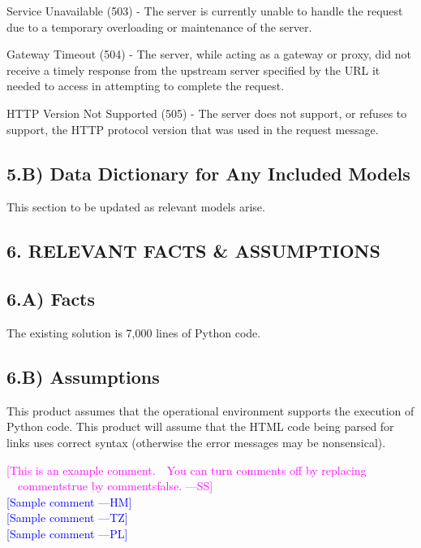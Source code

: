 \documentclass[12pt]{article}
\newcommand{\authornote}[3]{\textcolor{#1}{[#3 ---#2]}}
\newcommand{\authornote}[3]{}
\newcommand{\wss}[1]{\authornote{magenta}{SS}{#1}}
\newcommand{\hm}[1]{\authornote{blue}{HM}{#1}} %
\newcommand{\tz}[1]{\authornote{blue}{TZ}{#1}} %
\newcommand{\pl}[1]{\authornote{blue}{PL}{#1}} %
\begin{document}
Service Unavailable (503) - The server is currently unable to handle the request due to a temporary overloading or maintenance of the server.

Gateway Timeout (504) - The server, while acting as a gateway or proxy, did not receive a timely response from the upstream server specified by the URL it needed to access in attempting to complete the request.

HTTP Version Not Supported (505) - The server does not support, or refuses to support, the HTTP protocol version that was used in the request message.

\subsection*{5.B) Data Dictionary for Any Included Models}
This section to be updated as relevant models arise.

\subsection*{6. RELEVANT FACTS & ASSUMPTIONS}

\subsection*{6.A) Facts}
The existing solution is 7,000 lines of Python code.

\subsection*{6.B) Assumptions}
This product assumes that the operational environment supports the execution of Python code.
This product will assume that the HTML code being parsed for links uses correct syntax (otherwise the error messages may be nonsensical).

\noindent \wss{This is an example comment.  You can turn comments off by replacing
  commentstrue by commentsfalse.}\\
\hm{Sample comment}\\
\tz{Sample comment}\\
\pl{Sample comment}
\end{document}
